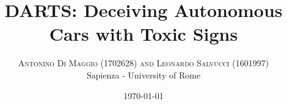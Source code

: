 \usepackage{fancyhdr} %
\pagestyle{fancy} %
\fancyhead{} %
\fancyfoot{} %
\fancyfoot[RO,LE]{\thepage} %

\usepackage{titling} %

\usepackage{hyperref} %


\setlength{\droptitle}{-4\baselineskip} %

\pretitle{\begin{center}\Huge\bfseries} %
\posttitle{\end{center}} %
\title{DARTS: Deceiving Autonomous Cars with Toxic Signs} %
\author{%
\textsc{Antonino Di Maggio (1702628)  and Leonardo Salvucci (1601997)} \\[1ex] %
\normalsize Sapienza - University of Rome \\ %
}
\date{\today} %
\renewcommand{\maketitlehookd}{%
\begin{abstract}
\noindent Recent studies show that the cutting edge deep neural networks are vulnerable to contradictory examples, deriving from small magnitude perturbations added to the input. With the advent of self-driving machines, the contradictory example, as we can imagine, can generate many complications: a car can interpret a signal incorrectly and generate an accident. In the following report, we want to analyze and test the problem, showing that it is possible to generate specific perturbations to the input images to confuse the model and, in some way, force the network prediction.
\end{abstract}
}


